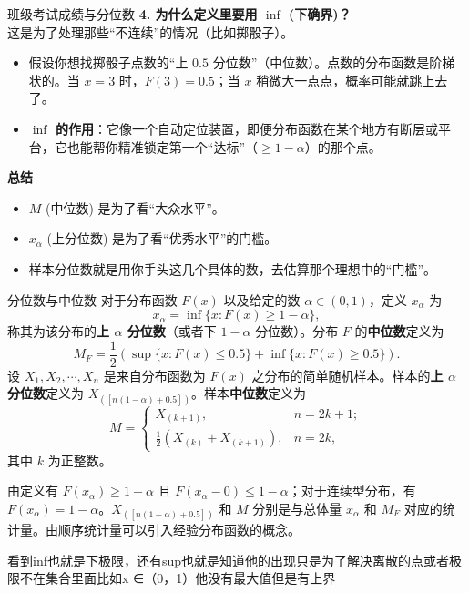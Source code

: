 \begin{example}{班级考试成绩与分位数}
\textbf{4. 为什么定义里要用 $\inf$ (下确界)？} \\
这是为了处理那些“不连续”的情况（比如掷骰子）。
\begin{itemize}
    \item 假设你想找掷骰子点数的“上 $0.5$ 分位数”（中位数）。点数的分布函数是阶梯状的。当 $x=3$ 时，$F(3)=0.5$；当 $x$ 稍微大一点点，概率可能就跳上去了。
    \item \textbf{$\inf$ 的作用}：它像一个自动定位装置，即便分布函数在某个地方有断层或平台，它也能帮你精准锁定第一个“达标”（$\geqslant 1-\alpha$）的那个点。
\end{itemize}

\textbf{总结} \\
\begin{itemize}
    \item $M$ (中位数) 是为了看“大众水平”。
    \item $x_\alpha$ (上分位数) 是为了看“优秀水平”的门槛。
    \item 样本分位数就是用你手头这几个具体的数，去估算那个理想中的“门槛”。
\end{itemize}
\end{example}
\begin{definition}{分位数与中位数}
    对于分布函数 $F(x)$ 以及给定的数 $\alpha \in (0,1)$，定义 $x_\alpha$ 为
    \[ x_\alpha = \inf\{x : F(x) \geqslant 1 - \alpha\}, \]
    称其为该分布的\textbf{上 $\alpha$ 分位数}（或者下 $1-\alpha$ 分位数）。分布 $F$ 的\textbf{中位数}定义为
    \[ M_F = \frac{1}{2}\left(\sup\{x : F(x) \leqslant 0.5\} + \inf\{x : F(x) \geqslant 0.5\}\right). \]
    设 $X_1, X_2, \cdots, X_n$ 是来自分布函数为 $F(x)$ 之分布的简单随机样本。样本的\textbf{上 $\alpha$ 分位数}定义为 $X_{([n(1-\alpha)+0.5])}$。样本\textbf{中位数}定义为
    \[ M = \begin{cases} 
        X_{(k+1)}, & n = 2k + 1; \\ 
        \frac{1}{2}(X_{(k)} + X_{(k+1)}), & n = 2k, 
    \end{cases} \]
    其中 $k$ 为正整数。

    由定义有 $F(x_\alpha) \geqslant 1 - \alpha$ 且 $F(x_\alpha - 0) \leqslant 1 - \alpha$；对于连续型分布，有 $F(x_\alpha) = 1 - \alpha$。$X_{([n(1-\alpha)+0.5])}$ 和 $M$ 分别是与总体量 $x_\alpha$ 和 $M_F$ 对应的统计量。由顺序统计量可以引入经验分布函数的概念。
\end{definition}
\begin{dxtips}
    看到inf也就是下极限，还有sup也就是知道他的出现只是为了解决离散的点或者极限不在集合里面比如x ∈（0，1）他没有最大值但是有上界
\end{dxtips}

